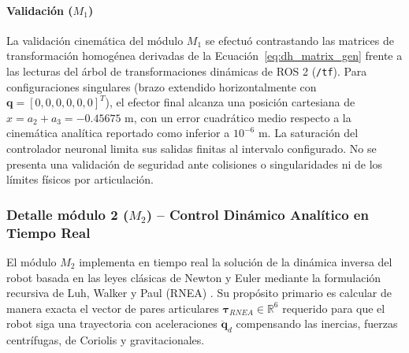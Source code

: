 \documentclass[12pt]{article}
\begin{document}
\paragraph{Validación ($M_1$)}
La validación cinemática del módulo $M_1$ se efectuó contrastando las matrices de transformación homogénea derivadas de la Ecuación~\eqref{eq:dh_matrix_gen} frente a las lecturas del árbol de transformaciones dinámicas de ROS 2 (\texttt{/tf}). Para configuraciones singulares (brazo extendido horizontalmente con $\bm{q} = [0, 0, 0, 0, 0, 0]^T$), el efector final alcanza una posición cartesiana de $x = a_2 + a_3 = -0.45675\text{ m}$, con un error cuadrático medio respecto a la cinemática analítica reportado como inferior a $10^{-6}\text{ m}$. La saturación del controlador neuronal limita sus salidas finitas al intervalo configurado. No se presenta una validación de seguridad ante colisiones o singularidades ni de los límites físicos por articulación.

\subsubsection{Detalle módulo 2 ($M_2$) -- Control Dinámico Analítico en Tiempo Real}
\label{sssec:detalle_m2}

El módulo $M_2$ implementa en tiempo real la solución de la dinámica inversa del robot basada en las leyes clásicas de Newton y Euler mediante la formulación recursiva de Luh, Walker y Paul (RNEA) \cite{luh1980online}. Su propósito primario es calcular de manera exacta el vector de pares articulares $\bm{\tau}_{RNEA} \in \mathbb{R}^6$ requerido para que el robot siga una trayectoria con aceleraciones $\ddot{\bm{q}}_d$ compensando las inercias, fuerzas centrífugas, de Coriolis y gravitacionales.
\end{document}
